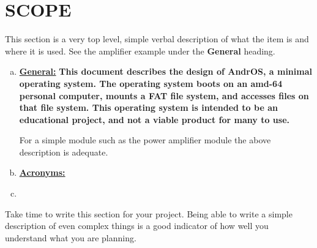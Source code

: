 \section{SCOPE}

\begin{slshape}
\color{blue} 
This section is a very top level, simple verbal description of what the item is and where it is used.   See the amplifier example under the \textbf{General} heading.
\bigskip
\end{slshape}


\begin{enumerate}[(a)]
	\item \textbf{\underline{General:}} \textbf{This document describes the design of AndrOS, a minimal operating system. The operating system boots on an amd-64 personal computer, mounts a FAT file system, and accesses files on that file system. This operating system is intended to be an educational project, and not a viable product for many to use.}
\bigskip

\begin{slshape}
\color{blue}
	For a simple module such as the power amplifier module the above description is adequate. 
\end{slshape}
\bigskip


	\item \textbf{\underline{Acronyms:}}\begin{slshape} \color{blue}{I have not chosen to define acronyms because I have a thing about the overuse of acronyms.  You may not be so burdened and find that typing out a name is simply too tedious.  Put those acronyms here.}\end{slshape}
	\item \begin{slshape} \color{blue}{Additional short descriptive paragraphs can be added only if 
	needed for special classification, designation of alternate versions or 
	other material that is part of a top-level description.}\end{slshape}
\end{enumerate}

\begin{slshape}
\color{blue}
\StopSign  Take time to write this section for your project.  Being able to write a simple description of even complex things is a good indicator of how well you understand what you are planning.
\end{slshape}
